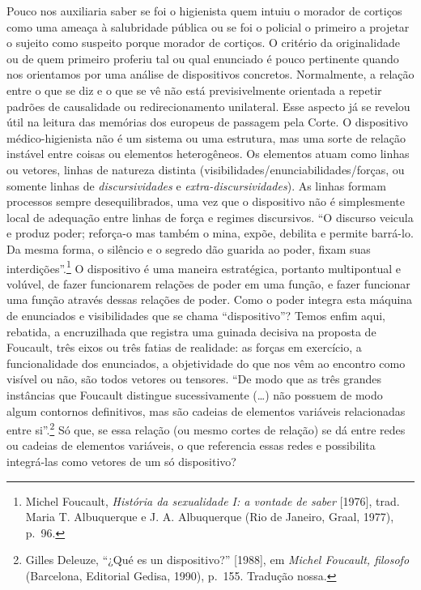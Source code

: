 Pouco nos auxiliaria saber se foi o higienista quem intuiu o morador de
cortiços como uma ameaça à salubridade pública ou se foi o policial o
primeiro a projetar o sujeito como suspeito porque morador de cortiços.
O critério da originalidade ou de quem primeiro proferiu tal ou qual
enunciado é pouco pertinente quando nos orientamos por uma análise de
dispositivos concretos. Normalmente, a relação entre o que se diz e o
que se vê não está previsivelmente orientada a repetir padrões de
causalidade ou redirecionamento unilateral. Esse aspecto já se revelou
útil na leitura das memórias dos europeus de passagem pela Corte. O
dispositivo médico-higienista não é um sistema ou uma estrutura, mas uma
sorte de relação instável entre coisas ou elementos heterogêneos. Os
elementos atuam como linhas ou vetores, linhas de natureza distinta
(visibilidades/enunciabilidades/forças, ou somente linhas de
\textit{discursividades} e \textit{extra-discursividades}). As linhas formam
processos sempre desequilibrados, uma vez que o dispositivo não é
simplesmente local de adequação entre linhas de força e regimes
discursivos. ``O discurso veicula e produz poder; reforça-o mas também o
mina, expõe, debilita e permite barrá-lo. Da mesma forma, o silêncio e o
segredo dão guarida ao poder, fixam suas interdições''.\footnote{Michel
  Foucault, \textit{História da sexualidade I: a vontade de saber}
  {[}1976{]}, trad. Maria T. Albuquerque e J. A. Albuquerque (Rio de
  Janeiro, Graal, 1977), p.~96.} O dispositivo é uma maneira
estratégica, portanto multipontual e volúvel, de fazer funcionarem
relações de poder em uma função, e fazer funcionar uma função através
dessas relações de poder. Como o poder integra esta máquina de
enunciados e visibilidades que se chama ``dispositivo''? Temos enfim
aqui, rebatida, a encruzilhada que registra uma guinada decisiva na
proposta de Foucault, três eixos ou três fatias de realidade: as forças
em exercício, a funcionalidade dos enunciados, a objetividade do que nos
vêm ao encontro como visível ou não, são todos vetores ou tensores. ``De
modo que as três grandes instâncias que Foucault distingue
sucessivamente (\ldots{}) não possuem de modo algum contornos
definitivos, mas são cadeias de elementos variáveis relacionadas entre
si''.\footnote{Gilles Deleuze, ``¿Qué es un dispositivo?'' {[}1988{]},
  em \textit{Michel Foucault, filosofo} (Barcelona, Editorial Gedisa,
  1990), p.~155. Tradução nossa.} Só que, se essa relação (ou mesmo
cortes de relação) se dá entre redes ou cadeias de elementos variáveis,
o que referencia essas redes e possibilita integrá-las como vetores de
um só dispositivo?

